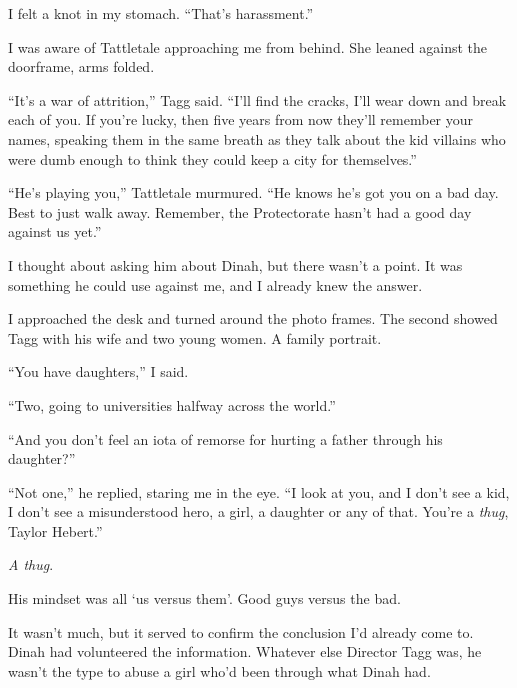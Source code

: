 I felt a knot in my stomach.  ``That's harassment.''



I was aware of Tattletale approaching me from behind.  She leaned against the doorframe, arms folded.



``It's a war of attrition,'' Tagg said.  ``I'll find the cracks, I'll wear down and break each of you.  If you're lucky, then five years from now they'll remember your names, speaking them in the same breath as they talk about the kid villains who were dumb enough to think they could keep a city for themselves.''



``He's playing you,'' Tattletale murmured.  ``He knows he's got you on a bad day.  Best to just walk away.  Remember, the Protectorate hasn't had a good day against us yet.''



I thought about asking him about Dinah, but there wasn't a point.  It was something he could use against me, and I already knew the answer.



I approached the desk and turned around the photo frames.  The second showed Tagg with his wife and two young women.  A family portrait.



``You have daughters,'' I said.



``Two, going to universities halfway across the world.''



``And you don't feel an iota of remorse for hurting a father through his daughter?''



``Not one,'' he replied, staring me in the eye.  ``I look at you, and I don't see a kid, I don't see a misunderstood hero, a girl, a daughter or any of that.  You're a \emph{thug}, Taylor Hebert.''



\emph{A thug}.



His mindset was all `us versus them'.  Good guys versus the bad.



It wasn't much, but it served to confirm the conclusion I'd already come to.  Dinah had volunteered the information.  Whatever else Director Tagg was, he wasn't the type to abuse a girl who'd been through what Dinah had.



